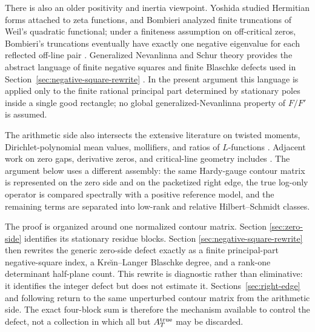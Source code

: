 There is also an older positivity and inertia viewpoint.  Yoshida studied
Hermitian forms attached to zeta functions, and Bombieri analyzed finite
truncations of Weil's quadratic functional; under a finiteness assumption on
off-critical zeros, Bombieri's truncations eventually have exactly one
negative eigenvalue for each reflected off-line pair
\cite{Yoshida1992,Bombieri2000}.  Generalized Nevanlinna and Schur theory
provides the abstract language of finite negative squares and finite Blaschke
defects used in Section~\ref{sec:negative-square-rewrite}
\cite{Lilleberg2020}.  In the present argument this language is applied only
to the finite rational principal part determined by stationary poles inside a
single good rectangle; no global generalized-Nevanlinna property of
\(F/F'\) is assumed.

The arithmetic side also intersects the extensive literature on twisted moments,
Dirichlet-polynomial mean values, mollifiers, and ratios of $L$-functions
\cite{BalasubramanianConreyHeathBrown1985,Farmer1993,
DeshouillersIwaniec1987,BettinChandee2018,BettinChandeeRadziwill2017,
BettinGonek2017,ConreyFarmerKeatingRubinsteinSnaith2003,CFKRS2005,
ConreyFarmerZirnbauer2008,ConreySnaith2007,ConreyGonek2001,
ConreyIwaniecSoundararajan2013,Sono2018,HLZ}.  Adjacent work on zero gaps,
derivative zeros, and critical-line geometry includes
\cite{Conrey1983,Bui2011,BuiMilinovichNg2010,BuiMilinovich2018,
FengWu2012,ChaubeyMalikRoblesZaharescu2018,Ivic1977,KeatingSnaith2000,
Kirila2018,Odlyzko1987,RudnickSarnak1996}.  The argument below uses a different
assembly: the same Hardy-gauge contour matrix is represented on the zero side
and on the packetized right edge, the true log-only operator is compared
spectrally with a positive reference model, and the remaining terms are
separated into low-rank and relative Hilbert--Schmidt classes.

The proof is organized around one normalized contour matrix.  Section
\ref{sec:zero-side} identifies its stationary residue blocks.  Section
\ref{sec:negative-square-rewrite} then rewrites the generic zero-side defect
exactly as a finite principal-part negative-square index, a Kre\u{\i}n--Langer
Blaschke degree, and a rank-one determinant half-plane count.  This rewrite is
diagnostic rather than eliminative: it identifies the integer defect but does
not estimate it.  Sections~\ref{sec:right-edge} and following return to the
same unperturbed contour matrix from the arithmetic side.  The exact four-block
sum is therefore the mechanism available to control the defect, not a
collection in which all but \(A_T^{\rm true}\) may be discarded.


